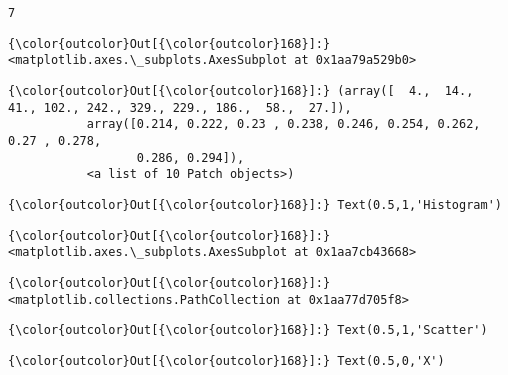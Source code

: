 \documentclass[11pt]{article}
\begin{document}
    \begin{Verbatim}[commandchars=\\\{\}]
7

    \end{Verbatim}

\begin{Verbatim}[commandchars=\\\{\}]
{\color{outcolor}Out[{\color{outcolor}168}]:} <matplotlib.axes.\_subplots.AxesSubplot at 0x1aa79a529b0>
\end{Verbatim}
            
\begin{Verbatim}[commandchars=\\\{\}]
{\color{outcolor}Out[{\color{outcolor}168}]:} (array([  4.,  14.,  41., 102., 242., 329., 229., 186.,  58.,  27.]),
           array([0.214, 0.222, 0.23 , 0.238, 0.246, 0.254, 0.262, 0.27 , 0.278,
                  0.286, 0.294]),
           <a list of 10 Patch objects>)
\end{Verbatim}
            
\begin{Verbatim}[commandchars=\\\{\}]
{\color{outcolor}Out[{\color{outcolor}168}]:} Text(0.5,1,'Histogram')
\end{Verbatim}
            
\begin{Verbatim}[commandchars=\\\{\}]
{\color{outcolor}Out[{\color{outcolor}168}]:} <matplotlib.axes.\_subplots.AxesSubplot at 0x1aa7cb43668>
\end{Verbatim}
            
\begin{Verbatim}[commandchars=\\\{\}]
{\color{outcolor}Out[{\color{outcolor}168}]:} <matplotlib.collections.PathCollection at 0x1aa77d705f8>
\end{Verbatim}
            
\begin{Verbatim}[commandchars=\\\{\}]
{\color{outcolor}Out[{\color{outcolor}168}]:} Text(0.5,1,'Scatter')
\end{Verbatim}
            
\begin{Verbatim}[commandchars=\\\{\}]
{\color{outcolor}Out[{\color{outcolor}168}]:} Text(0.5,0,'X')
\end{Verbatim}
            
\end{document}
